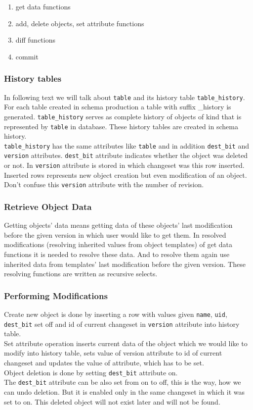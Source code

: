 \documentclass[deska]{subfiles}
\begin{document}
\begin{enumerate}
    \item get data functions
    \item add, delete objects, set attribute functions
    \item diff functions
    \item commit
\end{enumerate}

\subsubsection{History tables}
In following text we will talk about {\tt table} and its history table {\tt table\_history}.\\
For each table created in schema production a table with suffix \_history is generated. {\tt table\_history} serves as complete history of objects of kind that is represented by {\tt table} in database. These history tables are created in schema history.\\
{\tt table\_history} has the same attributes like {\tt table} and in addition {\tt dest\_bit} and {\tt version} attributes. {\tt dest\_bit} attribute indicates whether the object was deleted or not. In {\tt version} attribute is stored in which changeset was this row inserted. Inserted rows represents new object creation but even modification of an object. Don't confuse this {\tt version} attribute with the number of revision.

\subsubsection{Retrieve Object Data}
Getting objects' data means getting data of these objects' last modification before the given version in which user would like to get them.
In resolved modifications (resolving inherited values from object templates) of get data functions it is needed to resolve these data. And to resolve them again use inherited data from templates' last modification before the given version.
These resolving functions are written as recursive selects.

\subsubsection{Performing Modifications}
Create new object is done by inserting a row with values given {\tt name}, {\tt uid}, {\tt dest\_bit} set off and id of current changeset in {\tt version} attribute into history table.\\
Set attribute operation inserts current data of the object which we would like to modify into history table, sets value of version attribute to id of current changeset and updates the value of attribute, which has to be set.\\
Object deletion is done by setting {\tt dest\_bit} attribute on.\\
The {\tt dest\_bit} attribute can be also set from on to off, this is the way, how we can undo deletion. But it is enabled only in the same changeset in which it was set to on. This deleted object will not exist later and will not be found.
\end{document}
